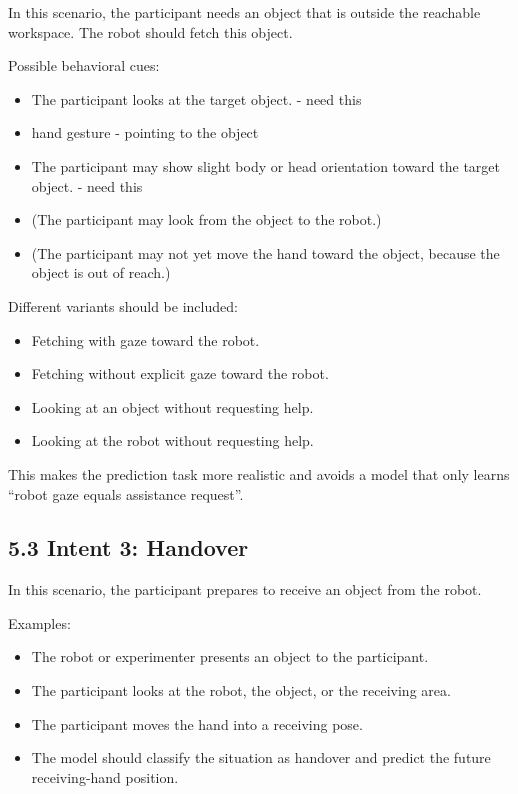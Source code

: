 \documentclass[11pt,a4paper]{article}
\begin{document}
In this scenario, the participant needs an object that is outside the reachable workspace. The robot should fetch this object.

Possible behavioral cues:
\begin{itemize}
    \item The participant looks at the target object.
        - need this 
    \item hand gesture - pointing to the  object 
    \item The participant may show slight body or head orientation toward the target object.
    - need this
    \item (The participant may look from the object to the robot.)
    \item (The participant may not yet move the hand toward the object, because the object is out of reach.)

\end{itemize}

Different variants should be included:
\begin{itemize}
    \item Fetching with gaze toward the robot.
    \item Fetching without explicit gaze toward the robot.
    \item Looking at an object without requesting help.
    \item Looking at the robot without requesting help.
\end{itemize}

This makes the prediction task more realistic and avoids a model that only learns ``robot gaze equals assistance request''.

\subsection*{5.3 Intent 3: Handover}

In this scenario, the participant prepares to receive an object from the robot.

Examples:
\begin{itemize}
    \item The robot or experimenter presents an object to the participant.
    \item The participant looks at the robot, the object, or the receiving area.
    \item The participant moves the hand into a receiving pose.
    \item The model should classify the situation as handover and predict the future receiving-hand position.
\end{itemize}
\end{document}
